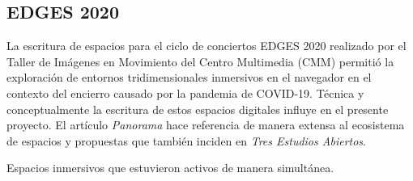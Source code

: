 \subsection{EDGES 2020}

La escritura de espacios para el ciclo de conciertos EDGES 2020 realizado por el Taller de Imágenes en Movimiento del Centro Multimedia (CMM) permitió la exploración de entornos tridimensionales inmersivos en el navegador en el contexto del encierro causado por la pandemia de COVID-19. Técnica y conceptualmente la escritura de estos espacios digitales influye en el presente proyecto. El artículo \textit{Panorama} \citep{panoramaArticulo} hace referencia de manera extensa al ecosistema de espacios y propuestas que también inciden en \textit{Tres Estudios Abiertos}.


Espacios inmersivos que estuvieron activos de manera simultánea. 

\printendnotes
